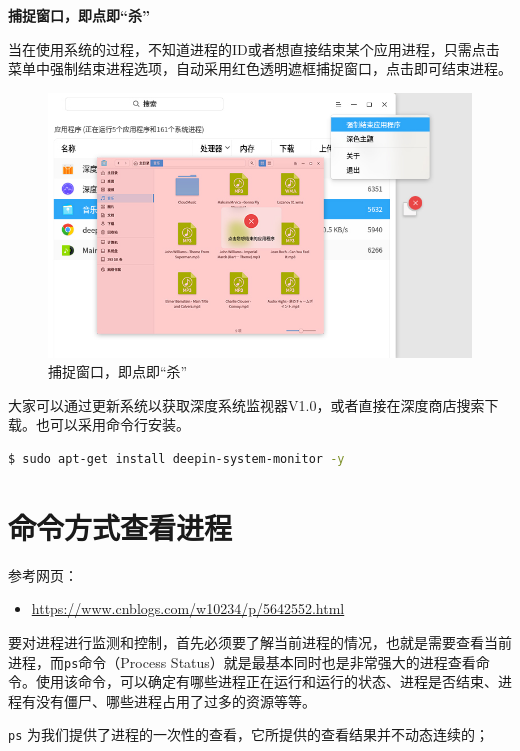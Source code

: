 \documentclass[doctor,openright,twoside]{sjtuthesis}
\providecommand{\tightlist}{%
    \setlength{\itemsep}{0pt}\setlength{\parskip}{0pt}}
\newcommand{\passthrough}[1]{#1}
\theoremstyle{plain}
\theoremstyle{definition}
\theoremstyle{remark}
\theoremstyle{ocrenumbox}
\theoremstyle{plain}
\begin{document}
\textbf{捕捉窗口，即点即``杀''}

当在使用系统的过程，不知道进程的ID或者想直接结束某个应用进程，只需点击菜单中强制结束进程选项，自动采用红色透明遮框捕捉窗口，点击即可结束进程。

\begin{figure}
\centering
\includegraphics{images/deepin-system-monitor-5.jpg}
\caption{捕捉窗口，即点即``杀''}
\end{figure}

大家可以通过更新系统以获取深度系统监视器V1.0，或者直接在深度商店搜索下载。也可以采用命令行安装。

\begin{lstlisting}[language=bash]
$ sudo apt-get install deepin-system-monitor -y
\end{lstlisting}

\section{命令方式查看进程}

参考网页：

\begin{itemize}
\tightlist
\item
  \url{https://www.cnblogs.com/w10234/p/5642552.html}
\end{itemize}

要对进程进行监测和控制，首先必须要了解当前进程的情况，也就是需要查看当前进程，而\passthrough{\lstinline!ps!}命令（Process
Status）就是最基本同时也是非常强大的进程查看命令。使用该命令，可以确定有哪些进程正在运行和运行的状态、进程是否结束、进程有没有僵尸、哪些进程占用了过多的资源等等。

\passthrough{\lstinline!ps!}
为我们提供了进程的一次性的查看，它所提供的查看结果并不动态连续的；
\end{document}
